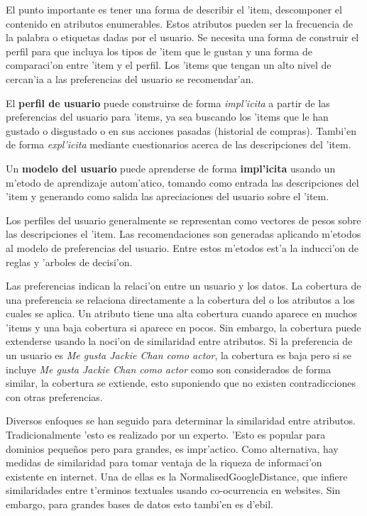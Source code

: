 \documentclass[11pt]{article}
\begin{document}
El punto importante es tener una forma de describir el 'item, descomponer el contenido en atributos enumerables. Estos atributos pueden ser la frecuencia de la palabra o etiquetas dadas por el usuario. Se necesita una forma de construir el perfil para que incluya los tipos de 'item que le gustan y una forma de comparaci'on entre 'item y el perfil. Los 'items que tengan un alto nivel de cercan'ia a las preferencias del usuario se recomendar'an.

El \textbf{perfil de usuario} puede construirse de forma \textit{impl'icita} a partir de las preferencias del usuario para 'items, ya sea buscando los 'items que le han gustado o disgustado o en sus acciones pasadas (historial de compras). Tambi'en de forma \textit{expl'icita} mediante cuestionarios acerca de las descripciones del 'item.

Un \textbf{modelo del usuario} puede aprenderse de forma \textbf{impl'icita} usando un m'etodo de aprendizaje autom'atico, tomando como entrada las descripciones del 'item y generando como salida las apreciaciones del usuario sobre el 'item.

Los perfiles del usuario generalmente se representan como vectores de pesos sobre las descripciones el 'item. Las recomendaciones son generadas aplicando m'etodos al modelo de preferencias del usuario. Entre estos m'etodos est'a la inducci'on de reglas y 'arboles de decisi'on.

Las preferencias indican la relaci'on entre un usuario y los datos. La cobertura de una preferencia se relaciona directamente a la cobertura del o los atributos a los cuales se aplica. Un atributo tiene una alta cobertura cuando aparece en muchos 'items y una baja cobertura si aparece en pocos. Sin embargo, la cobertura puede extenderse usando la noci'on de similaridad entre atributos. Si la preferencia de un usuario es \textit{Me gusta Jackie Chan como actor}, la cobertura es baja pero si se incluye \textit{Me gusta Jackie Chan como actor} como son considerados de forma similar, la cobertura se extiende, esto suponiendo que no existen contradicciones con otras preferencias.

 Diversos enfoques se han seguido para determinar la similaridad entre atributos. Tradicionalmente 'esto es realizado por un experto. 'Esto es popular para dominios peque\~{n}os pero para grandes, es impr'actico. Como alternativa, hay medidas de similaridad para tomar ventaja de la riqueza de informaci'on existente en internet. Una de ellas es la NormalisedGoogleDistance, que infiere similaridades entre t'erminos textuales usando co-ocurrencia en websites. Sin embargo, para grandes bases de datos esto tambi'en es d'ebil.
\end{document}
